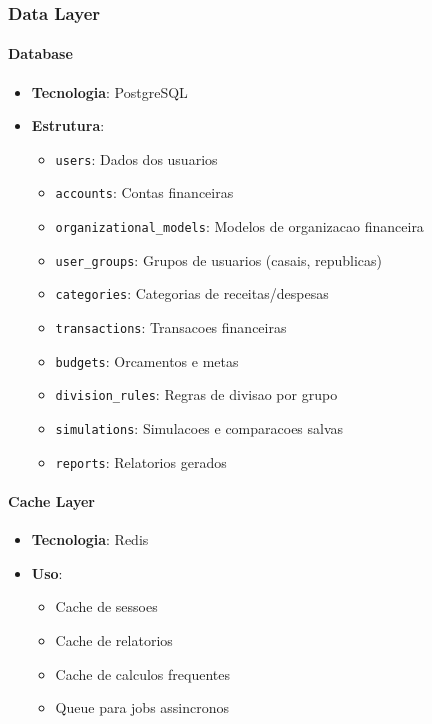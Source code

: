 \subsubsection{Data Layer}

\paragraph{Database}
\begin{itemize}
    \item \textbf{Tecnologia}: PostgreSQL
    \item \textbf{Estrutura}:
    \begin{itemize}
        \item \texttt{users}: Dados dos usuarios
        \item \texttt{accounts}: Contas financeiras
        \item \texttt{organizational\_models}: Modelos de organizacao financeira
        \item \texttt{user\_groups}: Grupos de usuarios (casais, republicas)
        \item \texttt{categories}: Categorias de receitas/despesas
        \item \texttt{transactions}: Transacoes financeiras
        \item \texttt{budgets}: Orcamentos e metas
        \item \texttt{division\_rules}: Regras de divisao por grupo
        \item \texttt{simulations}: Simulacoes e comparacoes salvas
        \item \texttt{reports}: Relatorios gerados
    \end{itemize}
\end{itemize}

\paragraph{Cache Layer}
\begin{itemize}
    \item \textbf{Tecnologia}: Redis
    \item \textbf{Uso}:
    \begin{itemize}
        \item Cache de sessoes
        \item Cache de relatorios
        \item Cache de calculos frequentes
        \item Queue para jobs assincronos
    \end{itemize}
\end{itemize}

